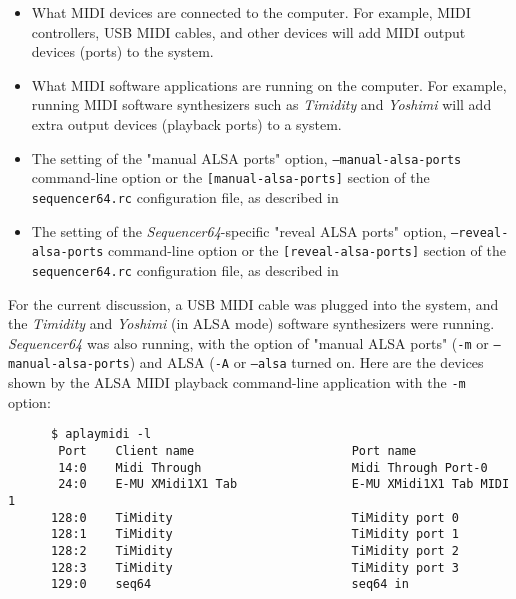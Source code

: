    \begin{itemize}
      \item What MIDI devices are connected to the computer.  For example,
         MIDI controllers, USB MIDI cables, and other devices will add MIDI
         output devices (ports) to the system.
      \item What MIDI software applications are running on the computer.
         For example, running MIDI software synthesizers such as
         \textsl{Timidity} and \textsl{Yoshimi} will add extra output devices
         (playback ports) to a system.
      \item The setting of the "manual ALSA ports" option,
         \texttt{--manual-alsa-ports} command-line option or the
         \texttt{[manual-alsa-ports]} section of the
         \texttt{sequencer64.rc} configuration file, as described in
      \item The setting of the \textsl{Sequencer64}-specific
         "reveal ALSA ports" option,
         \texttt{--reveal-alsa-ports} command-line option or the
         \texttt{[reveal-alsa-ports]} section of the
         \texttt{sequencer64.rc} configuration file, as described in
   \end{itemize}

   For the current discussion, a USB MIDI cable was plugged into the system,
   and the \textsl{Timidity} and \textsl{Yoshimi} (in ALSA mode) software
   synthesizers were running.  \textsl{Sequencer64} was also running,
   with the option of "manual ALSA ports" (\texttt{-m} or
   \texttt{--manual-alsa-ports}) and ALSA (\texttt{-A} or
   \texttt{--alsa} turned on.
   Here are the devices shown by the ALSA MIDI playback
   command-line application with the \texttt{-m} option:

   \begin{verbatim}
      $ aplaymidi -l
       Port    Client name                      Port name
       14:0    Midi Through                     Midi Through Port-0
       24:0    E-MU XMidi1X1 Tab                E-MU XMidi1X1 Tab MIDI 1
      128:0    TiMidity                         TiMidity port 0
      128:1    TiMidity                         TiMidity port 1
      128:2    TiMidity                         TiMidity port 2
      128:3    TiMidity                         TiMidity port 3
      129:0    seq64                            seq64 in
   \end{verbatim}

